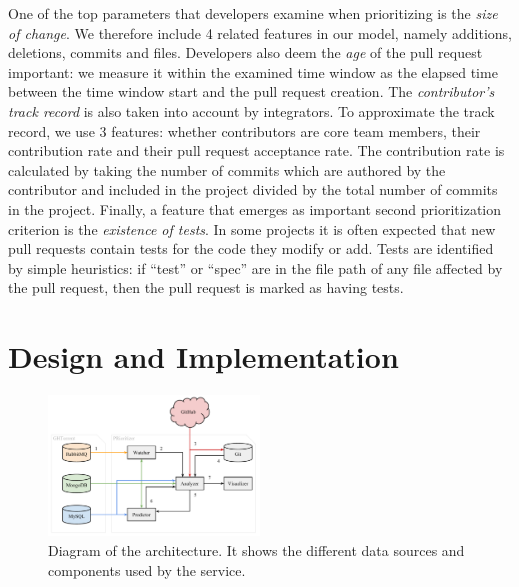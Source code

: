\documentclass[conference]{IEEEtran}
\begin{document}
One of the top parameters that developers examine when prioritizing is the
\textsl{size of change}. We therefore include 4 related features in our
model, namely additions, deletions, commits and files.
Developers also deem the \textsl{age} of the pull request important: we measure
it within the examined time window as the elapsed time between the time window
start and the pull request creation.
The \textsl{contributor's track record} is also taken into account by
integrators. To approximate the track record, we use 3 features: whether
contributors are core team members, their contribution rate and their pull
request acceptance rate. The contribution rate is calculated by taking the number of
commits which are authored by the contributor and included in the project
divided by the total number of commits in the project. Finally, a feature that emerges as important second
prioritization criterion is the \textsl{existence of tests}. In some projects it
is often expected that new pull requests contain tests for the code they modify or
add. Tests are identified by simple heuristics: if ``test'' or ``spec'' are in
the file path of any file affected by the pull request, then the pull request
is marked as having tests.

\section{Design and Implementation}
\label{sec:design}

\begin{figure}[!t]
  \centering
  \includegraphics[width=0.5\textwidth]{../figs/architecture.pdf}
  \vspace{-5mm}
  \caption[Diagram of the architecture]
   {Diagram of the architecture. It shows the different data sources and components used by the \prioritizer service.}
  \label{fig:architecture}
  \vspace{-5mm}
\end{figure}
\end{document}
